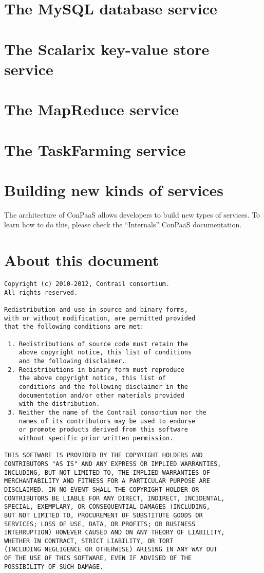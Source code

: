 \documentclass[10pt]{article}
\begin{document}
\section{The MySQL database service}

\section{The Scalarix key-value store service}

\section{The MapReduce service}

\section{The TaskFarming service}

\section{Building new kinds of services}

The architecture of ConPaaS allows developers to build new types of
services. To learn how to do this, please check the ``Internals''
ConPaaS documentation.

\section{About this document}

\begin{verbatim}
Copyright (c) 2010-2012, Contrail consortium.
All rights reserved.

Redistribution and use in source and binary forms, 
with or without modification, are permitted provided
that the following conditions are met:

 1. Redistributions of source code must retain the
    above copyright notice, this list of conditions
    and the following disclaimer.
 2. Redistributions in binary form must reproduce
    the above copyright notice, this list of 
    conditions and the following disclaimer in the
    documentation and/or other materials provided
    with the distribution.
 3. Neither the name of the Contrail consortium nor the
    names of its contributors may be used to endorse
    or promote products derived from this software 
    without specific prior written permission.

THIS SOFTWARE IS PROVIDED BY THE COPYRIGHT HOLDERS AND
CONTRIBUTORS "AS IS" AND ANY EXPRESS OR IMPLIED WARRANTIES,
INCLUDING, BUT NOT LIMITED TO, THE IMPLIED WARRANTIES OF
MERCHANTABILITY AND FITNESS FOR A PARTICULAR PURPOSE ARE
DISCLAIMED. IN NO EVENT SHALL THE COPYRIGHT HOLDER OR
CONTRIBUTORS BE LIABLE FOR ANY DIRECT, INDIRECT, INCIDENTAL,
SPECIAL, EXEMPLARY, OR CONSEQUENTIAL DAMAGES (INCLUDING, 
BUT NOT LIMITED TO, PROCUREMENT OF SUBSTITUTE GOODS OR 
SERVICES; LOSS OF USE, DATA, OR PROFITS; OR BUSINESS 
INTERRUPTION) HOWEVER CAUSED AND ON ANY THEORY OF LIABILITY,
WHETHER IN CONTRACT, STRICT LIABILITY, OR TORT
(INCLUDING NEGLIGENCE OR OTHERWISE) ARISING IN ANY WAY OUT
OF THE USE OF THIS SOFTWARE, EVEN IF ADVISED OF THE
POSSIBILITY OF SUCH DAMAGE.
\end{verbatim}
\end{document}
